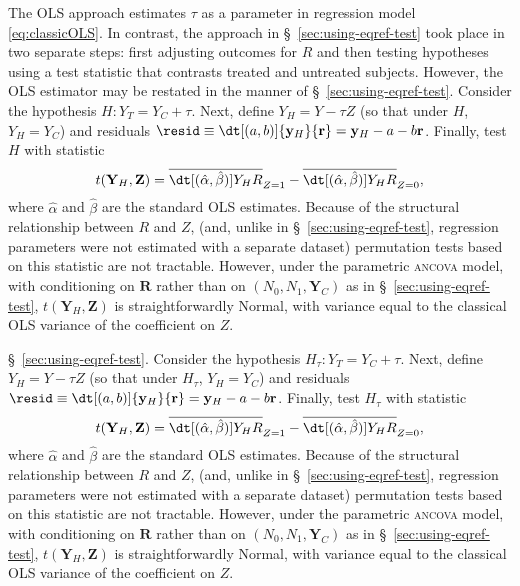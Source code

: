 The OLS approach estimates $\tau$ as a parameter in regression model
\eqref{eq:classicOLS}. In contrast, the approach in
\S~\ref{sec:using-eqref-test} took place in two separate steps:
first adjusting outcomes for $R$ and then testing hypotheses using a test
statistic that contrasts treated and untreated subjects.
However, the OLS estimator may be restated in the manner of \S~\ref{sec:using-eqref-test}.
Consider the hypothesis $H: Y_{T} = Y_{C} + \tau$.
Next, define ${{Y}_H} = {Y} - \tau {Z}$ (so that under $H$, $Y_H=Y_C$)
and residuals $\resid\equiv\dt[(a, b)]{\mathbf{y}_{H}}{ \mathbf{r}} = {\mathbf{y}_H} - a -
b\mathbf{r}$.
Finally, test $H$ with statistic
\begin{equation*}
t(\mathbf{Y}_H , \mathbf{Z}) =
\overline{\dt[(\hat{\alpha},\hat{\beta})]{{{Y}_H}}{ {R}}}_{Z=1} -
\overline{\dt[(\hat{\alpha},\hat{\beta})]{{{Y}_H}}{ {R}}}_{Z=0},
\end{equation*}
where $\hat{\alpha}$ and $\hat{\beta}$ are the standard OLS estimates.
Because of the structural relationship
between $R$ and $Z$, (and, unlike in
\S~\ref{sec:using-eqref-test}, regression parameters were not estimated
with a separate dataset)
permutation tests based on this statistic are not tractable.
However, under the parametric \textsc{ancova} model, with
conditioning on $\mathbf{R}$ rather than on $(N_{0}, N_{1},
\mathbf{Y}_{C})$ as in \S~\ref{sec:using-eqref-test},
$t(\mathbf{Y}_H , \mathbf{Z})$ is straightforwardly Normal, with
variance equal to the classical OLS variance of the coefficient on
$Z$.

\S~\ref{sec:using-eqref-test}.
Consider the hypothesis $H_\tau: Y_{T} = Y_{C} + \tau$.
Next, define ${{Y}_H} = {Y} - \tau {Z}$ (so that under $H_\tau$, $Y_H=Y_C$)
and residuals $\resid\equiv\dt[(a, b)]{\mathbf{y}_{H}}{ \mathbf{r}} = {\mathbf{y}_H} - a -
b\mathbf{r}$.
Finally, test $H_\tau$ with statistic
\begin{equation*}
t(\mathbf{Y}_H , \mathbf{Z}) =
\overline{\dt[(\hat{\alpha},\hat{\beta})]{{{Y}_H}}{ {R}}}_{Z=1} -
\overline{\dt[(\hat{\alpha},\hat{\beta})]{{{Y}_H}}{ {R}}}_{Z=0},
\end{equation*}
where $\hat{\alpha}$ and $\hat{\beta}$ are the standard OLS estimates.
Because of the structural relationship
between $R$ and $Z$, (and, unlike in
\S~\ref{sec:using-eqref-test}, regression parameters were not estimated
with a separate dataset)
permutation tests based on this statistic are not tractable.
However, under the parametric \textsc{ancova} model, with
conditioning on $\mathbf{R}$ rather than on $(N_{0}, N_{1},
\mathbf{Y}_{C})$ as in \S~\ref{sec:using-eqref-test},
$t(\mathbf{Y}_H , \mathbf{Z})$ is straightforwardly Normal, with
variance equal to the classical OLS variance of the coefficient on
$Z$.

